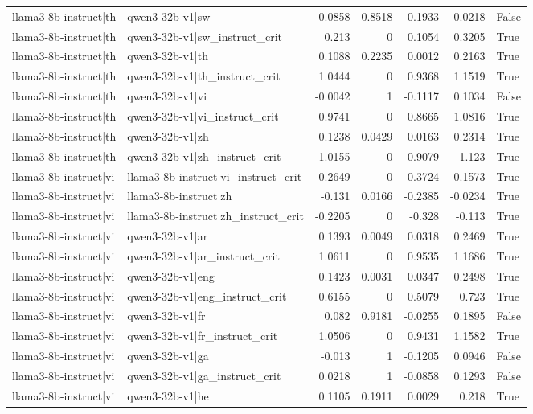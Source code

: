 \begin{table}
\begin{tabular}{l l r r r r l}
llama3-8b-instruct|th & qwen3-32b-v1|sw & -0.0858 & 0.8518 & -0.1933 & 0.0218 & False \\
llama3-8b-instruct|th & qwen3-32b-v1|sw_instruct_crit & 0.213 & 0 & 0.1054 & 0.3205 & True \\
llama3-8b-instruct|th & qwen3-32b-v1|th & 0.1088 & 0.2235 & 0.0012 & 0.2163 & True \\
llama3-8b-instruct|th & qwen3-32b-v1|th_instruct_crit & 1.0444 & 0 & 0.9368 & 1.1519 & True \\
llama3-8b-instruct|th & qwen3-32b-v1|vi & -0.0042 & 1 & -0.1117 & 0.1034 & False \\
llama3-8b-instruct|th & qwen3-32b-v1|vi_instruct_crit & 0.9741 & 0 & 0.8665 & 1.0816 & True \\
llama3-8b-instruct|th & qwen3-32b-v1|zh & 0.1238 & 0.0429 & 0.0163 & 0.2314 & True \\
llama3-8b-instruct|th & qwen3-32b-v1|zh_instruct_crit & 1.0155 & 0 & 0.9079 & 1.123 & True \\
llama3-8b-instruct|vi & llama3-8b-instruct|vi_instruct_crit & -0.2649 & 0 & -0.3724 & -0.1573 & True \\
llama3-8b-instruct|vi & llama3-8b-instruct|zh & -0.131 & 0.0166 & -0.2385 & -0.0234 & True \\
llama3-8b-instruct|vi & llama3-8b-instruct|zh_instruct_crit & -0.2205 & 0 & -0.328 & -0.113 & True \\
llama3-8b-instruct|vi & qwen3-32b-v1|ar & 0.1393 & 0.0049 & 0.0318 & 0.2469 & True \\
llama3-8b-instruct|vi & qwen3-32b-v1|ar_instruct_crit & 1.0611 & 0 & 0.9535 & 1.1686 & True \\
llama3-8b-instruct|vi & qwen3-32b-v1|eng & 0.1423 & 0.0031 & 0.0347 & 0.2498 & True \\
llama3-8b-instruct|vi & qwen3-32b-v1|eng_instruct_crit & 0.6155 & 0 & 0.5079 & 0.723 & True \\
llama3-8b-instruct|vi & qwen3-32b-v1|fr & 0.082 & 0.9181 & -0.0255 & 0.1895 & False \\
llama3-8b-instruct|vi & qwen3-32b-v1|fr_instruct_crit & 1.0506 & 0 & 0.9431 & 1.1582 & True \\
llama3-8b-instruct|vi & qwen3-32b-v1|ga & -0.013 & 1 & -0.1205 & 0.0946 & False \\
llama3-8b-instruct|vi & qwen3-32b-v1|ga_instruct_crit & 0.0218 & 1 & -0.0858 & 0.1293 & False \\
llama3-8b-instruct|vi & qwen3-32b-v1|he & 0.1105 & 0.1911 & 0.0029 & 0.218 & True \\

\end{tabular}
\end{table}
